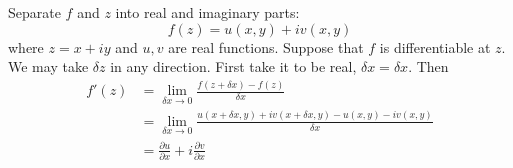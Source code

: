 \documentclass[a4paper]{article}
\begin{document}
Separate \(f\) and \(z\) into real and imaginary parts:
\[
  f(z) = u(x, y) + iv(x, y)
\]
where \(z = x + iy\) and \(u, v\) are real functions. Suppose that \(f\) is differentiable at \(z\). We may take \(\delta z\) in any direction. First take it to be real, \(\delta x = \delta x\). Then
\begin{align*}
  f'(z) &= \lim_{\delta x \to 0} \frac{f(z + \delta x) - f(z)}{\delta x} \\
        &= \lim_{\delta x \to 0} \frac{u(x + \delta x, y) + iv(x + \delta x, y) - u(x, y) - iv(x, y)}{\delta x} \\
        &= \frac{\partial u}{\partial x} + i \frac{\partial v}{\partial x}
\end{align*}



\printindex
\end{document}
